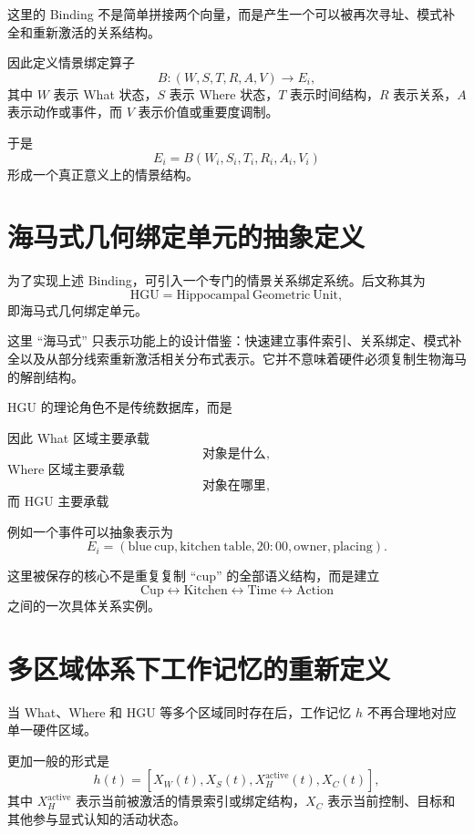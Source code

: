 这里的 Binding 不是简单拼接两个向量，而是产生一个可以被再次寻址、模式补全和重新激活的关系结构。

因此定义情景绑定算子
\[
B:
(
W,S,T,R,A,V
)
\rightarrow
E_i,
\]
其中 $W$ 表示 What 状态，$S$ 表示 Where 状态，$T$ 表示时间结构，$R$ 表示关系，$A$ 表示动作或事件，而 $V$ 表示价值或重要度调制。

于是
\[
\boxed{
E_i
=
B(W_i,S_i,T_i,R_i,A_i,V_i)
}
\]
形成一个真正意义上的情景结构。

\section{海马式几何绑定单元的抽象定义}

为了实现上述 Binding，可引入一个专门的情景关系绑定系统。后文称其为
\[
\mathrm{HGU}
=
\mathrm{Hippocampal\ Geometric\ Unit},
\]
即海马式几何绑定单元。

这里 ``海马式'' 只表示功能上的设计借鉴：快速建立事件索引、关系绑定、模式补全以及从部分线索重新激活相关分布式表示。它并不意味着硬件必须复制生物海马的解剖结构。

HGU 的理论角色不是传统数据库，而是
\begin{statementbox}
\centering
{}
\end{statementbox}

因此 What 区域主要承载
\[
\text{对象是什么},
\]
Where 区域主要承载
\[
\text{对象在哪里},
\]
而 HGU 主要承载
\begin{statementbox}
\centering
{}
\end{statementbox}

例如一个事件可以抽象表示为
\[
E_i=
(
\mathrm{blue\ cup},
\mathrm{kitchen\ table},
20{:}00,
\mathrm{owner},
\mathrm{placing}
).
\]

这里被保存的核心不是重复复制 ``cup'' 的全部语义结构，而是建立
\[
\mathrm{Cup}
\leftrightarrow
\mathrm{Kitchen}
\leftrightarrow
\mathrm{Time}
\leftrightarrow
\mathrm{Action}
\]
之间的一次具体关系实例。

\section{多区域体系下工作记忆的重新定义}

当 What、Where 和 HGU 等多个区域同时存在后，工作记忆 $h$ 不再合理地对应单一硬件区域。

更加一般的形式是
\[
\boxed{
h(t)
=
[
X_W(t),
X_S(t),
X_H^{\mathrm{active}}(t),
X_C(t)
],
}
\]
其中 $X_H^{\mathrm{active}}$ 表示当前被激活的情景索引或绑定结构，$X_C$ 表示当前控制、目标和其他参与显式认知的活动状态。

